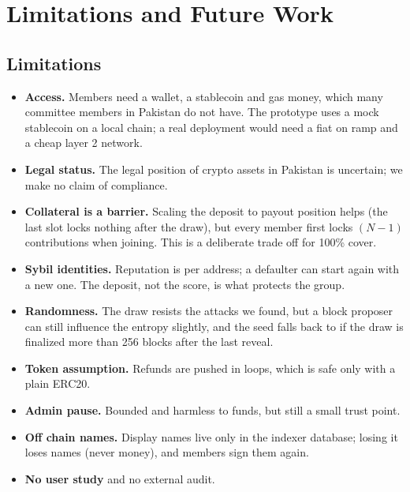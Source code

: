\section{Limitations and Future Work}
\label{sec:limits}

\subsection{Limitations}
\begin{itemize}
  \item \textbf{Access.} Members need a wallet, a stablecoin and gas money, which many committee members
        in Pakistan do not have. The prototype uses a mock stablecoin on a local chain; a real deployment
        would need a fiat on ramp and a cheap layer 2 network.
  \item \textbf{Legal status.} The legal position of crypto assets in Pakistan is uncertain; we make no
        claim of compliance.
  \item \textbf{Collateral is a barrier.} Scaling the deposit to payout position helps (the last slot locks
        nothing after the draw), but every member first locks $(N-1)$ contributions when joining. This is
        a deliberate trade off for 100\% cover.
  \item \textbf{Sybil identities.} Reputation is per address; a defaulter can start again with a new one.
        The deposit, not the score, is what protects the group.
  \item \textbf{Randomness.} The draw resists the attacks we found, but a block proposer can still influence
        the entropy slightly, and the seed falls back to  if the draw is finalized more
        than 256 blocks after the last reveal.
  \item \textbf{Token assumption.} Refunds are pushed in loops, which is safe only with a plain ERC20.
  \item \textbf{Admin pause.} Bounded and harmless to funds, but still a small trust point.
  \item \textbf{Off chain names.} Display names live only in the indexer database; losing it loses names
        (never money), and members sign them again.
  \item \textbf{No user study} and no external audit.
\end{itemize}


